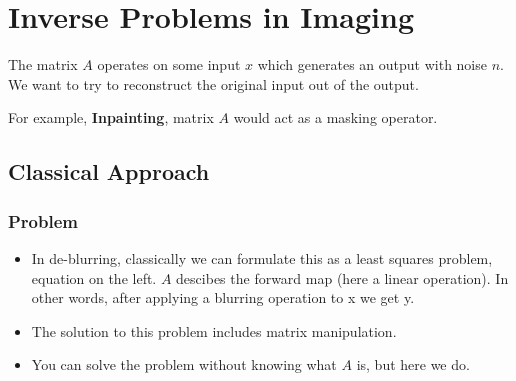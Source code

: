 \documentclass[11pt]{article}
\begin{document}


\tableofcontents

\clearpage

\section{Inverse Problems in Imaging}

\begin{minipage}[l]{.5\linewidth}
    \begin{figure}[H]
        \centering
    \end{figure}    
\end{minipage}\hfill
\begin{minipage}[r]{.48\linewidth}
    The matrix $A$ operates on some input $x$ which generates an output with noise $n$. We want to try to reconstruct the original input out of the output. 
    
    For example, \textbf{Inpainting}, matrix $A$ would act as a masking operator.
\end{minipage}

\subsection{Classical Approach}

\subsubsection{Problem}

\begin{minipage}[l]{.5\linewidth}
    \begin{figure}[H]
        \centering
    \end{figure}    
\end{minipage}\hfill
\begin{minipage}[r]{.48\linewidth}
    \begin{itemize}
        \item In de-blurring, classically we can formulate this as a least squares problem, equation on the left. $A$ descibes the forward map (here a linear operation). In other words, after applying a blurring operation to x we get y. 
        \item The solution to this problem includes matrix manipulation.
        \item You can solve the problem without knowing what $A$ is, but here we do.
    \end{itemize}
\end{minipage}
\end{document}
